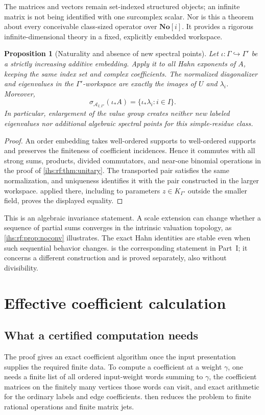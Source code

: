 \documentclass[11pt,a4paper]{article}
\numberwithin{equation}{section}
\newtheorem{proposition}[proposition]{Proposition}
\theoremstyle{definition}
\theoremstyle{remark}
\newcommand{\No}{\mathbf{No}}
\begin{document}
The matrices and vectors remain set-indexed structured objects; an infinite
matrix is not being identified with one surcomplex scalar. Nor is this a
theorem about every conceivable class-sized operator over $\No[i]$. It
provides a rigorous infinite-dimensional theory in a fixed, explicitly
embedded workspace.

\begin{proposition}[Naturality and absence of new spectral points]\label{ihs:rf:prop:extension}
Let $\iota:\Gamma\hookrightarrow\Gamma'$ be a strictly increasing additive
embedding. Apply it to all Hahn exponents of $A$, keeping the same index set
and complex coefficients. The normalized diagonalizer and eigenvalues in the
$\Gamma'$-workspace are exactly the images of $U$ and $\lambda_i$. Moreover,
\[
 \sigma_{\mathcal A_{I,\Gamma'}}(\iota_*A)=\{\iota_*\lambda_i:i\in I\}.
\]
In particular, enlargement of the value group creates neither new labeled
eigenvalues nor additional algebraic spectral points for this simple-residue
class.
\end{proposition}
\begin{proof}
An order embedding takes well-ordered supports to well-ordered supports and
preserves the finiteness of coefficient incidences. Hence it commutes with
all strong sums, products, divided commutators, and near-one binomial
operations in the proof of \cref{ihs:rf:thm:unitary}. The transported pair
satisfies the same normalization, and uniqueness identifies it with the pair
constructed in the larger workspace.  applied
there, including to parameters $z\in K_{\Gamma'}$ outside the smaller field,
proves the displayed equality.
\end{proof}

This is an algebraic invariance statement. A scale extension can change
whether a sequence of partial sums converges in the intrinsic valuation
topology, as \cref{ihs:rf:prop:noconv} illustrates. The exact Hahn
identities are stable even when such sequential behavior changes.
 is the corresponding statement in
Part~I; it concerns a different construction and is proved separately,
also without divisibility.

\section{Effective coefficient calculation}\label{ihs:rf:sec:computation}

\subsection{What a certified computation needs}\label{ihs:rf:sec:contract}
The proof gives an exact coefficient algorithm once the input presentation
supplies the required finite data. To compute a coefficient at a weight
$\gamma$, one needs a finite list of all ordered input-weight words summing
to $\gamma$, the coefficient matrices on the finitely many vertices those
words can visit, and exact arithmetic for the ordinary labels and edge
coefficients.  then reduces the problem to finite
rational operations and finite matrix jets.
\end{document}
